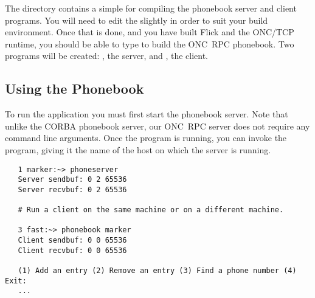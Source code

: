 The  directory contains a simple
 for compiling the phonebook server and client programs.
You will need to edit the  slightly in order to suit your
build environment.  Once that is done, and you have built Flick and the ONC/TCP
runtime, you should be able to type  to build the ONC~RPC
phonebook.  Two programs will be created: , the server,
and , the client.



\subsection{Using the Phonebook}
\label{subsec:ONCRPC:Using the Phonebook}

To run the application you must first start the phonebook server.  Note that
unlike the CORBA phonebook server, our ONC~RPC server does not require any
command line arguments.  Once the  program is running, you
can invoke the  program, giving it the name of the host on
which the server is running.

\begin{verbatim}
   1 marker:~> phoneserver
   Server sendbuf: 0 2 65536
   Server recvbuf: 0 2 65536

   # Run a client on the same machine or on a different machine.

   3 fast:~> phonebook marker
   Client sendbuf: 0 0 65536
   Client recvbuf: 0 0 65536

   (1) Add an entry (2) Remove an entry (3) Find a phone number (4) Exit:
   ...
\end{verbatim}




